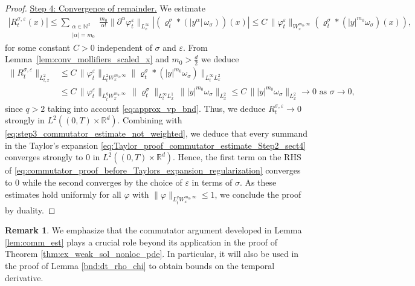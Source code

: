 \documentclass[reqno, 11pt]{amsart}
\numberwithin{equation}{section}
\theoremstyle{definition}
\newtheorem{rem}[thm]{Remark}
\begin{document}
\begin{proof}
    \underline{Step 4: Convergence of remainder.}
    We estimate
    \begin{align*}
        |R_t^{\sigma,\varepsilon}(x)|
        \leq \sum_{\substack{\alpha\in\mathbb{N}^d \\ |\alpha|=m_0}}
        \frac{m_0}{\alpha!}\|\partial^\alpha \varphi_t^\varepsilon\|_{L_{x}^\infty} |(\varrho_t^\sigma\ast (|y^\alpha|\,\omega_\sigma))(x)|
        \leq C\,\|\varphi_t^{\varepsilon}\|_{W_x^{m_0,\infty}} (\varrho_t^\sigma\ast (|y|^{m_0}\omega_\sigma)(x)),
    \end{align*}
    for some constant $C>0$ independent of $\sigma$ and $\varepsilon$. From Lemma~\ref{lem:conv_mollifiers_scaled_x} and $m_0> \frac{d}{2}$ we deduce
    \begin{align*}
        \| R_t^{\sigma,\varepsilon} \|_{L^2_{t,x}} &\leq C\,\|\varphi_t^{\varepsilon}\|_{L^2_t W_x^{m_0,\infty}} \|\varrho_t^\sigma\ast (|y|^{m_0}\omega_\sigma)\|_{L^{\infty}_t L^2_x}\\
        &\leq C\,\|\varphi_t^{\varepsilon}\|_{L^q_t W_x^{m_0,\infty}}\, \|\varrho_t^\sigma \|_{L^{\infty}_t L^1_x}\, \| |y|^{m_0}\omega_\sigma\|_{L^2_x} \leq C\, \| |y|^{m_0}\omega_\sigma\|_{L^2_x} \to 0 \mbox{ as } \sigma\to 0,
    \end{align*}
    since $q>2$ taking into account \eqref{eq:approx_vp_bnd}. Thus, we deduce $R_t^{\sigma,\varepsilon} \to 0$ strongly in $L^2((0,T)\times \mathbb{R}^{d})$. Combining with \eqref{eq:step3_commutator_estimate_not_weighted}, we deduce that every summand in the Taylor's expansion \eqref{eq:Taylor_proof_commutator_estimate_Step2_sect4} converges strongly to 0 in $L^2((0,T)\times\mathbb{R}^{d})$. Hence, the first term on the RHS of \eqref{eq:commutator_proof_before_Taylors_expansion_regularization} converges to 0 while the second converges by the choice of $\varepsilon$ in terms of $\sigma$. As these estimates hold uniformly for all $\varphi$ with $\|\varphi\|_{L_t^q W_x^{m_0,\infty}}\leq 1$, we conclude the proof by duality.
\end{proof}

\begin{rem}
    We emphasize that the commutator argument developed in Lemma \ref{lem:comm_est} plays a crucial role beyond its application in the proof of Theorem \ref{thm:ex_weak_sol_nonloc_pde}. In particular, it will also be used in the proof of Lemma \ref{bnd:dt_rho_chi} to obtain bounds on the temporal derivative.
\end{rem}

\end{document}
